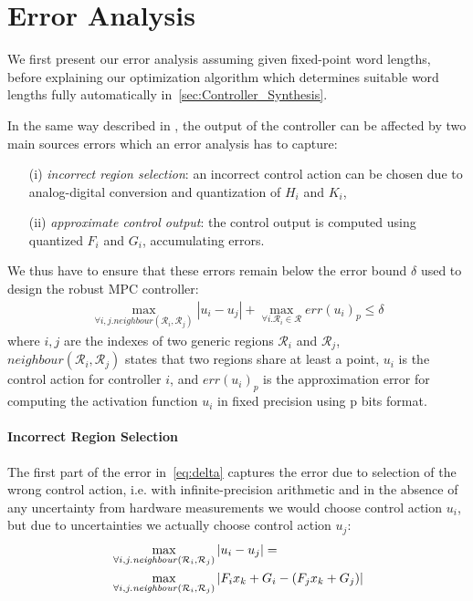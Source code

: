 \section{Error Analysis}
\label{sec:Error_Analysis}

We first present our error analysis assuming given fixed-point word lengths,
before explaining our optimization algorithm which determines suitable word
lengths fully automatically in~\autoref{sec:Controller_Synthesis}.

In the same way described in \cite{imperialrmpc}, the output of the controller can be affected by two main sources errors which an error
analysis has to capture: 
\begin{itemize}
  \item[(i)] \emph{incorrect region selection}: an incorrect control action can be chosen
    due to analog-digital conversion and quantization of $H_i$ and $K_i$,

  \item[(ii)] \emph{approximate control output}: the control output is computed
    using quantized $F_i$ and $G_i$, accumulating errors.
\end{itemize}

We thus have to ensure that these errors remain below the error bound $\delta$
used to design the robust MPC controller:
\begin{align}\label{eq:delta}
  \max_{\forall i,j. \mathit{neighbour}(\mathcal{R}_{i},\mathcal{R}_{j})}|u_{i}-u_{j}| + \max_{\forall i.\mathcal{R}_{i}\in\mathcal{R}} err(u_{i})_{p} \le \delta
\end{align}
where $i,j$ are the indexes of two generic regions $\mathcal{R}_{i}$ and
$\mathcal{R}_{j}$, \\ $\mathit{neighbour}(\mathcal{R}_{i},\mathcal{R}_{j})$ states that
two regions share at least a point, $u_{i}$ is the
control action for controller $i$, and $err(u_{i})_{p}$ is
the approximation error for computing the activation function $u_{i}$ in fixed precision using p bits format.
\paragraph{Incorrect Region Selection}

The first part of the error in~\autoref{eq:delta} captures the error due to
selection of the wrong control action, i.e. with infinite-precision arithmetic
and in the absence of any uncertainty from hardware measurements we would choose
control action $u_i$, but due to uncertainties we actually choose control action $u_j$:
\begin{align} \label{eq:maximization}
  &\max_{\forall i,j.\mathit{neighbour}(\mathcal{R}_{i},\mathcal{R}_{j})}|u_{i}-u_{j}|= \\
  &\max_{\forall i,j.\mathit{neighbour}(\mathcal{R}_{i},\mathcal{R}_{j})}|F_{i}x_{k}+G_{i} - (F_{j}x_{k}+G_{j})|\nonumber
\end{align}

